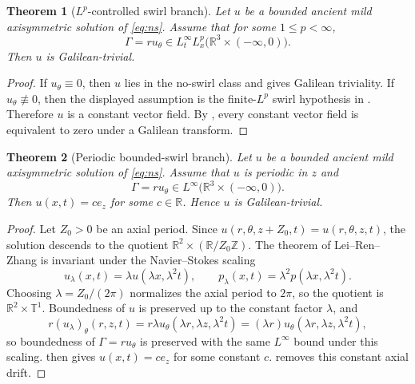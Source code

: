 \documentclass[11pt]{amsart}
\theoremstyle{plain}
\newtheorem{theorem}{Theorem}[section]
\theoremstyle{definition}
\theoremstyle{remark}
\numberwithin{equation}{section}
\begin{document}
\begin{theorem}[\(L^p\)-controlled swirl branch]\label{thm:lp-swirl}
Let \(u\) be a bounded ancient mild axisymmetric solution of \eqref{eq:ns}.
Assume that for some \(1\le p<\infty\),
\[
   \Gamma=ru_\theta\in L_t^\infty L_x^p
      \bigl(\mathbb R^3\times(-\infty,0)\bigr).
\]
Then \(u\) is Galilean-trivial.
\end{theorem}

\begin{proof}
If \(u_\theta\equiv0\), then \(u\) lies in the no-swirl class and
 gives Galilean triviality.  If \(u_\theta\not\equiv0\),
then the displayed assumption is the finite-\(L^p\) swirl hypothesis in
.  Therefore \(u\) is a constant vector field.  By
, every constant vector field is equivalent to zero under a
Galilean transform.
\end{proof}

\begin{theorem}[Periodic bounded-swirl branch]\label{thm:periodic}
Let \(u\) be a bounded ancient mild axisymmetric solution of \eqref{eq:ns}.
Assume that \(u\) is periodic in \(z\) and
\[
   \Gamma=ru_\theta\in L^\infty
      \bigl(\mathbb R^3\times(-\infty,0)\bigr).
\]
Then \(u(x,t)=ce_z\) for some \(c\in\mathbb R\).  Hence \(u\) is
Galilean-trivial.
\end{theorem}

\begin{proof}
Let \(Z_0>0\) be an axial period.  Since \(u(r,\theta,z+Z_0,t)=u(r,\theta,z,t)\),
the solution descends to the quotient
\(\mathbb R^2\times(\mathbb R/Z_0\mathbb Z)\).  The theorem of
Lei--Ren--Zhang is invariant under the Navier--Stokes scaling
\[
   u_\lambda(x,t)=\lambda u(\lambda x,\lambda^2t),
   \qquad
   p_\lambda(x,t)=\lambda^2p(\lambda x,\lambda^2t).
\]
Choosing \(\lambda=Z_0/(2\pi)\) normalizes the axial period to \(2\pi\), so the
quotient is \(\mathbb R^2\times\mathbb T^1\).  Boundedness of \(u\) is
preserved up to the constant factor \(\lambda\), and
\[
   r(u_\lambda)_\theta(r,z,t)
   =
   r\lambda u_\theta(\lambda r,\lambda z,\lambda^2t)
   =
   (\lambda r)u_\theta(\lambda r,\lambda z,\lambda^2t),
\]
so boundedness of \(\Gamma=ru_\theta\) is preserved with the same
\(L^\infty\) bound under this scaling.
 then gives \(u(x,t)=ce_z\) for some constant \(c\).
 removes this constant axial drift.
\end{proof}
\end{document}
